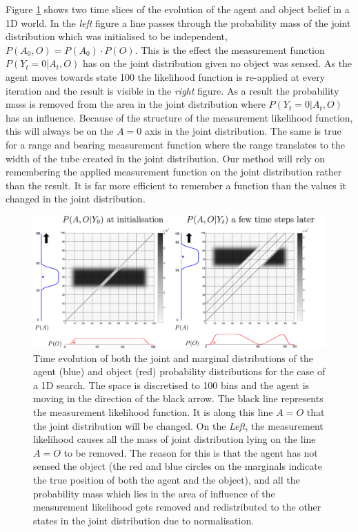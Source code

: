 Figure \ref{fig:margina_joint_example} shows two time slices of the evolution of the agent and object belief in a 1D world. In the \textit{left}
figure a line passes through the probability mass of the joint distribution which was initialised to be independent,
$P(A_0,O) = P(A_0) \cdot P(O)$. 
This is the effect the measurement function $P(Y_t=0|A_t,O)$ has on the joint distribution given no object was sensed. As the agent 
moves towards state 100 the likelihood function is re-applied at every iteration and the result is visible in the \textit{right} figure. 
As a result the probability mass is removed from the area in the joint distribution where $P(Y_t=0|A_t,O)$ has an influence.
Because of the structure of the measurement likelihood function, this will always be on the $A=0$ axis in the joint distribution. 
The same is true for a range and bearing measurement function where the range translates to the width of the tube created in the 
joint distribution. Our method will rely on remembering the applied measurement function on the joint distribution rather than the result. 
It is far more efficient to remember a function than the values it changed in the
joint distribution.

\begin{figure}
 \centering
 \includegraphics[width=\textwidth]{./ch5-MLMF/Figures/Figure6.pdf}
 \caption{Time evolution of both the joint and marginal distributions of the agent (blue) and object (red) probability distributions for 
 the case of a 1D search. The space is discretised to 100 bins and the agent is moving in the direction of the black arrow. 
 The black line represents the measurement likelihood function. It is along this line $A=O$ that the joint distribution will be
 changed. On the \textit{Left}, the measurement likelihood causes all the mass of joint distribution
 lying on the line $A=O$ to be removed. 
 The reason for this is that the agent has not sensed the object (the red and blue circles on the marginals indicate the true position of
 both the agent and the object), and all the probability mass which lies in the area of influence of the measurement likelihood gets 
 removed and redistributed to the other states in the joint distribution due to normalisation.}
 \label{fig:margina_joint_example}
\end{figure}

